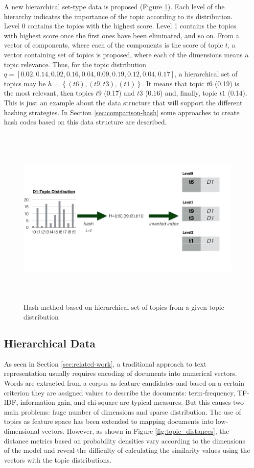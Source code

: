 A new hierarchical set-type data is proposed (Figure \ref{fig:hash_functions}). Each level of the hierarchy indicates the importance of the topic according to its distribution. Level 0 contains the topics with the highest score. Level 1 contains the topics with highest score once the first ones have been eliminated, and so on. From a vector of components, where each of the components is the score of topic $t$, a  vector containing set of topics is proposed, where each of the dimensions means a topic relevance. Thus, for the topic distribution
$q=[0.02,0.14,0.02,0.16,0.04,0.09,0.19,0.12,0.04,0.17]$, a hierarchical set of topics may be $h=\left \{(t6),(t9,t3),(t1) \right \}$. It means that topic $t6$ (0.19) is the most relevant, then topics $t9$ (0.17) and $t3$ (0.16) and, finally, topic $t1$ (0.14). This is just an example about the data structure that will support the different hashing strategies. In Section \ref{sec:comparison-hash} some approaches to create hash codes based on this data structure are described.

\begin{figure}
\includegraphics[width=\textwidth,height=9cm]{hashFunctions.png}
\caption{Hash method based on hierarchical set of topics from a given topic distribution}
\label{fig:hash_functions}
\end{figure}

\subsection{Hierarchical Data}
\label{sec:comparison-datatype}
As seen in Section \ref{sec:related-work}, a traditional approach to text representation usually requires encoding of documents into numerical vectors. Words are extracted from a corpus as feature candidates and based on a certain criterion they are assigned values to describe the documents: term-frequency, TF-IDF, information gain, and chi-square are typical measures. But this causes two main problems: huge number of dimensions and sparse distribution. The use of topics as feature space has been extended to mapping documents into low-dimensional vectors. However, as shown in Figure \ref{fig:topic_distances}, the distance metrics based on probability densities vary according to the dimensions of the model and reveal the difficulty of calculating the similarity values using the vectors with the topic distributions.  

